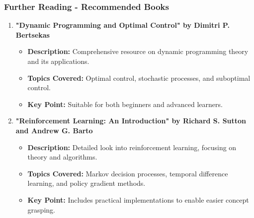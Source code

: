 \documentclass[aspectratio=169]{beamer}
\begin{document}
\begin{frame}[fragile]
    \frametitle{Further Reading - Recommended Books}
    \begin{enumerate}
        \item \textbf{"Dynamic Programming and Optimal Control" by Dimitri P. Bertsekas}
        \begin{itemize}
            \item \textbf{Description:} Comprehensive resource on dynamic programming theory and its applications.
            \item \textbf{Topics Covered:} Optimal control, stochastic processes, and suboptimal control.
            \item \textbf{Key Point:} Suitable for both beginners and advanced learners.
        \end{itemize}
    
        \item \textbf{"Reinforcement Learning: An Introduction" by Richard S. Sutton and Andrew G. Barto}
        \begin{itemize}
            \item \textbf{Description:} Detailed look into reinforcement learning, focusing on theory and algorithms.
            \item \textbf{Topics Covered:} Markov decision processes, temporal difference learning, and policy gradient methods.
            \item \textbf{Key Point:} Includes practical implementations to enable easier concept grasping.
        \end{itemize}
    \end{enumerate}
\end{frame}
\end{document}
